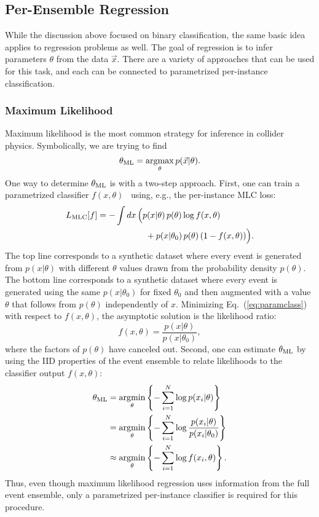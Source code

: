 \documentclass[aps,prx,reprint,preprintnumbers,superscriptaddress,nofootinbib,longbibliography,floatfix]{revtex4-2}
\DeclareMathOperator*{\argmax}{argmax}
\DeclareMathOperator*{\argmin}{argmin}
\newcommand{\thetanaught}{\theta_0}
\newcommand{\thetaML}{\theta_{\rm ML}}
\DeclareRobustCommand{\Eq}[1]{Eq.~(\ref{eq:#1})}
\begin{document}
\subsection{Per-Ensemble Regression}
\label{sec:regression}

While the discussion above focused on binary classification, the same basic idea applies to regression problems as well.
%
The goal of regression is to infer parameters $\theta$ from the data $\vec{x}$.
%
There are a variety of approaches that can be used for this task, and each can be connected to parametrized per-instance classification.

\subsubsection{Maximum Likelihood}
%
Maximum likelihood is the most common strategy for inference in collider physics.
%
Symbolically, we are trying to find
%
\begin{equation}
    \thetaML=\argmax_\theta p(\vec{x}|\theta).
\end{equation}
%
One way to determine $\thetaML$ is with a two-step approach.
%
First, one can train a parametrized classifier $f(x,\theta)$~\cite{Cranmer:2015bka,Baldi:2016fzo} using, e.g., the per-instance MLC loss:
%
\begin{align}\nonumber
    L_{\rm MLC}[f]=-\int dx\, \Big(& p(x|\theta)\, p(\theta) \log f(x,\theta)\\
    &~ + p(x|\thetanaught) \, p(\theta) \, (1- f(x,\theta)) \Big).
    \label{eq:paramclass}
\end{align}    
%
The top line corresponds to a synthetic dataset where every event is generated from $p(x|\theta)$ with different $\theta$ values drawn from the probability density $p(\theta)$.
%
The bottom line corresponds to a synthetic dataset where every event is generated using the same $p(x|\thetanaught)$ for fixed $\thetanaught$ and then augmented with a value $\theta$ that follows from $p(\theta)$ independently of $x$.
%
Minimizing \Eq{paramclass} with respect to $f(x,\theta)$, the asymptotic solution is the likelihood ratio:
%
\begin{equation}
\label{eq:paramed}
f(x,\theta) = \frac{p(x|\theta)}{p(x|\thetanaught)},
\end{equation}
%
where the factors of $p(\theta)$ have canceled out.
%
Second, one can estimate $\thetaML$ by using the IID properties of the event ensemble to relate likelihoods to the classifier output $f(x,\theta)$:
    \begin{align}
        \thetaML&=\argmin_\theta\left\{- \sum_{i=1}^N\log p(x_i|\theta)\right\} \nonumber\\
        &= \argmin_\theta\left\{- \sum_{i=1}^N \log  \frac{p(x_i|\theta)}{p(x_i|\thetanaught)} \right\} \nonumber\\
        &\approx \argmin_{\theta}\left\{-\sum_{i=1}^N \log f(x_i,\theta)\right\}. \label{eq:theta_star}
    \end{align}
%
Thus, even though maximum likelihood regression uses information from the full event ensemble, only a parametrized per-instance classifier is required for this procedure.
\end{document}
